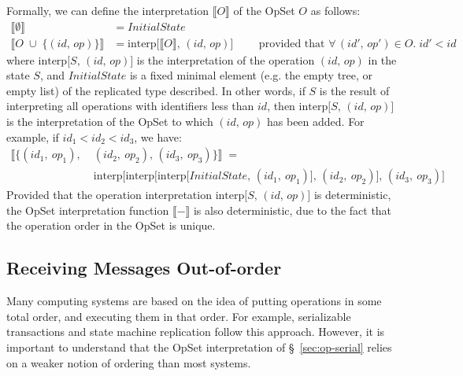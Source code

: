 Formally, we can define the interpretation $\llbracket O \rrbracket$ of the OpSet $O$ as follows:
\begin{align*}
    \big\llbracket \emptyset \big\rrbracket &= \mathit{InitialState} \\
    \big\llbracket O \;\cup\; \{(\mathit{id},\, \mathit{op})\} \big\rrbracket &=
    \mathrm{interp}\big[\llbracket O \rrbracket,\, (\mathit{id},\, \mathit{op})\big]
    \qquad\text{ provided that } \forall\,(\mathit{id}',\, \mathit{op}') \in O.\; \mathit{id}' < \mathit{id}
\end{align*}
where $\mathrm{interp}\big[S,\, (\mathit{id},\, \mathit{op})\big]$ is the interpretation of the operation $(\mathit{id},\, \mathit{op})$ in the state $S$, and $\mathit{InitialState}$ is a fixed minimal element (e.g. the empty tree, or empty list) of the replicated type described.
In other words, if $S$ is the result of interpreting all operations with identifiers less than $\mathit{id}$, then
$\mathrm{interp}\big[S,\, (\mathit{id},\, \mathit{op})\big]$ is the interpretation of the OpSet to which $(\mathit{id},\, \mathit{op})$ has been added.
For example, if $\mathit{id}_1 < \mathit{id}_2 < \mathit{id}_3$, we have:
\begin{align*}
    \big\llbracket \{(\mathit{id}_1,\ \mathit{op}_1),\;
    &(\mathit{id}_2,\ \mathit{op}_2),\,
    (\mathit{id}_3,\ \mathit{op}_3)\} \big\rrbracket \;=\\
    &\mathrm{interp}\big[\mathrm{interp}\big[\mathrm{interp}\big[\mathit{InitialState},\,
    (\mathit{id}_1,\ \mathit{op}_1)\big],\,
    (\mathit{id}_2,\ \mathit{op}_2)\big],\,
    (\mathit{id}_3,\ \mathit{op}_3)\big]
\end{align*}
Provided that the operation interpretation $\mathrm{interp}\big[S,\, (\mathit{id},\, \mathit{op})\big]$ is deterministic, the OpSet interpretation function $\llbracket-\rrbracket$ is also deterministic, due to the fact that the operation order in the OpSet is unique.

\subsection{Receiving Messages Out-of-order}\label{sec:order-change}

Many computing systems are based on the idea of putting operations in some total order, and executing them in that order.
For example, serializable transactions \cite{Kleppmann:2017wj} and state machine replication \cite{Schneider:1990vy} follow this approach.
However, it is important to understand that the OpSet interpretation of \S~\ref{sec:op-serial} relies on a weaker notion of ordering than most systems.


